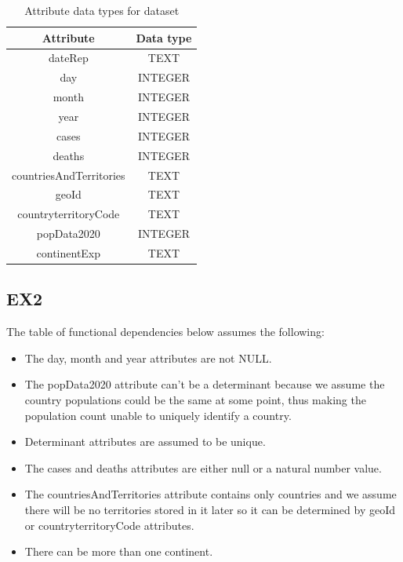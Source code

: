 \documentclass[12pt,oneside,a4paper,english]{article}
\begin{document}
  
\begin{table}[h]
 \caption{Attribute data types for dataset}
 \centering 
 \begin{tabular}{c c} %
  \hline\hline %
  \textbf{Attribute} & \textbf{Data type} \\ [1ex]
  \hline %
  dateRep & TEXT\\ [1ex] 
  day & INTEGER\\ [1ex]
  month & INTEGER\\ [1ex]
  year & INTEGER\\ [1ex]
  cases & INTEGER\\ [1ex]
  deaths & INTEGER\\ [1ex]
  countriesAndTerritories & TEXT\\ [1ex]
  geoId & TEXT\\ [1ex]
  countryterritoryCode & TEXT\\ [1ex]
  popData2020 & INTEGER\\ [1ex]
  continentExp & TEXT\\ [1ex]
  \hline
 \end{tabular}
\end{table}

\subsection{EX2}
\normalsize
\noindent The table of functional dependencies below assumes the following:

\begin{itemize}
 \item {The day, month and year attributes are not NULL.}
 \item {The popData2020 attribute can't be a determinant because we assume the country populations could be the same at some point, thus making the population count unable to uniquely identify a country.}
 \item {Determinant attributes are assumed to be unique.}
 \item {The cases and deaths attributes are either null or a natural number value.}
 \item {The countriesAndTerritories attribute contains only countries and we assume there will be no territories stored in it later so it can be determined by geoId or countryterritoryCode attributes.}
 \item {There can be more than one continent.}
\end{itemize}
\end{document}
